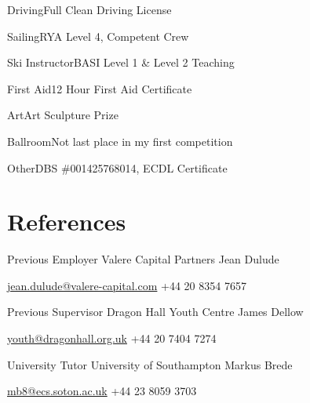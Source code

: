 \documentclass{tccv}
\begin{document}
\begin{factlist}
\item{Driving}{Full Clean Driving License}
\item{Sailing}{RYA Level 4, Competent Crew}
\item{Ski Instructor}{BASI Level 1 \& Level 2 Teaching}
\item{First Aid}{12 Hour First Aid Certificate}
\item{Art}{Art Sculpture Prize}
\item{Ballroom}{Not last place in my first competition}
\item{Other}{DBS \#001425768014, ECDL Certificate}
\end{factlist}


\vfill

\section{References}

\begin{eventlist}

\item{Previous Employer}
     {Valere Capital Partners}
     {Jean Dulude}

\href{mailto:jean.dulude@valere-capital.com}{jean.dulude@valere-capital.com}
\newline
+44 20 8354 7657
     
     
\item{Previous Supervisor}
     {Dragon Hall Youth Centre}
     {James Dellow}

\href{mailto:youth@dragonhall.org.uk}{youth@dragonhall.org.uk}
\newline
+44 20 7404 7274

\item{University Tutor}
     {University of Southampton}
     {Markus Brede}

\href{mailto:mb8@ecs.soton.ac.uk}{mb8@ecs.soton.ac.uk}
\newline
+44 23 8059 3703

\end{eventlist}
\end{document}
